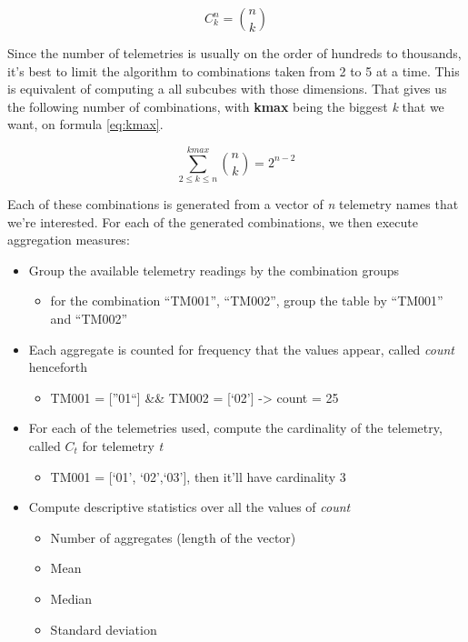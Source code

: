 \begin{equation} \label{eq:cardinalitygeneral}
C_k^n = \binom{n}{k}
\end{equation}

Since the number of telemetries is usually on the order of hundreds to thousands, it's best to limit the algorithm to combinations taken from 2 to 5 at a time.
This is equivalent of computing a all subcubes with those dimensions.
That gives us the following number of combinations, with \textbf{kmax} being the biggest \emph{k} that we want, on formula \ref{eq:kmax}.

\begin{equation} \label{eq:kmax}
\sum_{2\leq{k}\leq{n}}^{kmax}\binom nk = 2^{n-2}
\end{equation}

Each of these combinations is generated from a vector of \emph{n} telemetry names that we're interested.
For each of the generated combinations, we then execute aggregation measures:

\begin{itemize}[noitemsep]
\item
  Group the available telemetry readings by the combination groups
  \begin{itemize}
  \item
    for the combination ``TM001'', ``TM002'', group the table by ``TM001'' and ``TM002''
  \end{itemize}
\item
  Each aggregate is counted for frequency that the values appear, called \emph{count} henceforth

  \begin{itemize}
  \item
    TM001 = [''01``] \&\& TM002 = [`02'] -\textgreater{} count = 25
  \end{itemize}
\item
  For each of the telemetries used, compute the cardinality of the telemetry, called \(C_t\) for telemetry \emph{t}

  \begin{itemize}
  \item
    TM001 = [`01', `02',`03'], then it'll have cardinality 3
  \end{itemize}
\item
  Compute descriptive statistics over all the values of \emph{count}

  \begin{itemize}[noitemsep]
  \item Number of aggregates (length of the vector)
  \item Mean
  \item Median
  \item Standard deviation
  \end{itemize}
\end{itemize}

